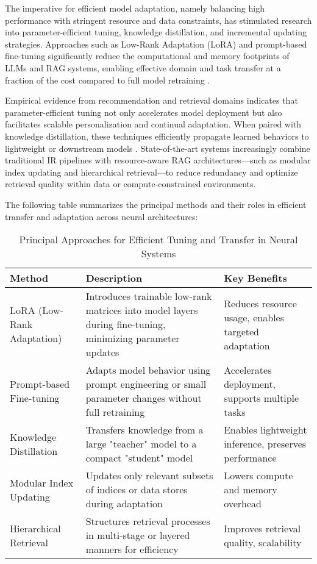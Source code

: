 The imperative for efficient model adaptation, namely balancing high performance with stringent resource and data constraints, has stimulated research into parameter-efficient tuning, knowledge distillation, and incremental updating strategies. Approaches such as Low-Rank Adaptation (LoRA) and prompt-based fine-tuning significantly reduce the computational and memory footprints of LLMs and RAG systems, enabling effective domain and task transfer at a fraction of the cost compared to full model retraining \cite{ref32, ref33, ref55, ref61}.

Empirical evidence from recommendation and retrieval domains indicates that parameter-efficient tuning not only accelerates model deployment but also facilitates scalable personalization and continual adaptation. When paired with knowledge distillation, these techniques efficiently propagate learned behaviors to lightweight or downstream models \cite{ref55}. State-of-the-art systems increasingly combine traditional IR pipelines with resource-aware RAG architectures—such as modular index updating and hierarchical retrieval—to reduce redundancy and optimize retrieval quality within data or compute-constrained environments.

The following table summarizes the principal methods and their roles in efficient transfer and adaptation across neural architectures:

\begin{table*}[htbp]
\centering
\caption{Principal Approaches for Efficient Tuning and Transfer in Neural Systems}
\label{tab:efficient_transfer}
\begin{adjustbox}{max width=\textwidth}
\begin{tabular}{lll}
\toprule
\textbf{Method} & \textbf{Description} & \textbf{Key Benefits} \\
\midrule
LoRA (Low-Rank Adaptation) & Introduces trainable low-rank matrices into model layers during fine-tuning, minimizing parameter updates & Reduces resource usage, enables targeted adaptation \\
Prompt-based Fine-tuning & Adapts model behavior using prompt engineering or small parameter changes without full retraining & Accelerates deployment, supports multiple tasks \\
Knowledge Distillation & Transfers knowledge from a large "teacher" model to a compact "student" model & Enables lightweight inference, preserves performance \\
Modular Index Updating & Updates only relevant subsets of indices or data stores during adaptation & Lowers compute and memory overhead \\
Hierarchical Retrieval & Structures retrieval processes in multi-stage or layered manners for efficiency & Improves retrieval quality, scalability \\
\bottomrule
\end{tabular}
\end{adjustbox}
\end{table*}

